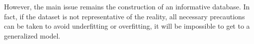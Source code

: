 \documentclass[a4paper,10pt]{article}
\begin{document}
However, the main issue remains the construction of an informative database. In fact, if the dataset is not representative of the reality, all necessary precautions can be taken to avoid underfitting or overfitting, it will be impossible to get to a generalized model.




\end{document}
